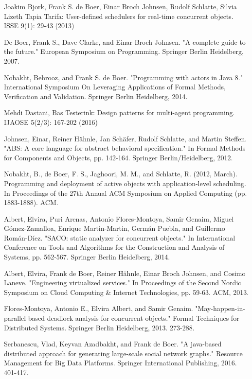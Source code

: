 \documentclass[sigplan,10pt,review,anonymous]{acmart}\settopmatter{printfolios=true}
\begin{document}
\begin{thebibliography}{4}
	
	Joakim Bjork, Frank S. de Boer, Einar Broch Johnsen, Rudolf Schlatte, Silvia Lizeth Tapia Tarifa:
	User-defined schedulers for real-time concurrent objects. ISSE 9(1): 29-43 (2013)
	
	De Boer, Frank S., Dave Clarke, and Einar Broch Johnsen. "A complete guide to the future." European Symposium on Programming. Springer Berlin Heidelberg, 2007.
	
	 Nobakht, Behrooz, and Frank S. de Boer. "Programming with actors in Java 8." International Symposium On Leveraging Applications of Formal Methods, Verification and Validation. Springer Berlin Heidelberg, 2014.
	
	 Mehdi Dastani, Bas Testerink:
	Design patterns for multi-agent programming. IJAOSE 5(2/3): 167-202 (2016)
	
	 Johnsen, Einar, Reiner Hähnle, Jan Schäfer, Rudolf Schlatte, and Martin Steffen. "ABS: A core language for abstract behavioral specification." In Formal Methods for Components and Objects, pp. 142-164. Springer Berlin/Heidelberg, 2012.
	
	 Nobakht, B., de Boer, F. S., Jaghoori, M. M., and Schlatte, R. (2012, March). Programming and deployment of active objects with application-level scheduling. In Proceedings of the 27th Annual ACM Symposium on Applied Computing (pp. 1883-1888). ACM.
	
	 Albert, Elvira, Puri Arenas, Antonio Flores-Montoya, Samir Genaim, Miguel Gómez-Zamalloa, Enrique Martin-Martin, Germán Puebla, and Guillermo Román-Díez. "SACO: static analyzer for concurrent objects." In International Conference on Tools and Algorithms for the Construction and Analysis of Systems, pp. 562-567. Springer Berlin Heidelberg, 2014.
	
	 Albert, Elvira, Frank de Boer, Reiner Hähnle, Einar Broch Johnsen, and Cosimo Laneve. "Engineering virtualized services." In Proceedings of the Second Nordic Symposium on Cloud Computing \& Internet Technologies, pp. 59-63. ACM, 2013.
	
	Flores-Montoya, Antonio E., Elvira Albert, and Samir Genaim. "May-happen-in-parallel based deadlock analysis for concurrent objects." Formal Techniques for Distributed Systems. Springer Berlin Heidelberg, 2013. 273-288.
	
	Serbanescu, Vlad, Keyvan Azadbakht, and Frank de Boer. "A java-based distributed approach for generating large-scale social network graphs." Resource Management for Big Data Platforms. Springer International Publishing, 2016. 401-417.
	

\end{thebibliography}
\end{document}
